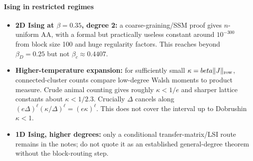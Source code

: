 \paragraph{Ising in restricted regimes}\label{ising-in-restricted-regimes}

\begin{itemize}
\tightlist
\item
  \textbf{2D Ising at \(\beta=0.35\), degree 2:} a coarse-graining/SSM proof gives \(n\)-uniform AA, with a formal but practically useless constant around \(10^{-300}\) from block size 100 and huge regularity factors. This reaches beyond \(\beta_D=0.25\) but not \(\beta_c\approx0.4407\).
\item
  \textbf{Higher-temperature expansion:} for sufficiently small \(\kappa=\beta\|J\|_{\rm row}\), connected-cluster counts compare low-degree Walsh moments to product measure. Crude animal counting gives roughly \(\kappa<1/e\) and sharper lattice constants about \(\kappa<1/2.3\). Crucially \(\Delta\) cancels along \((e\Delta)^\ell(\kappa/\Delta)^\ell=(e\kappa)^\ell\). This does not cover the interval up to Dobrushin \(\kappa<1\).
\item
  \textbf{1D Ising, higher degrees:} only a conditional transfer-matrix/LSI route remains in the notes; do not quote it as an established general-degree theorem without the block-routing step.
\end{itemize}
